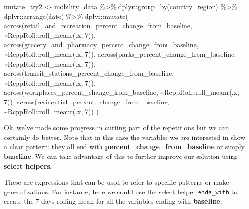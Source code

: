 \documentclass[
]{book}
\newenvironment{Shaded}{\begin{snugshade}}{\end{snugshade}}
\newcommand{\DecValTok}[1]{\textcolor[rgb]{0.00,0.00,0.81}{#1}}
\newcommand{\FunctionTok}[1]{\textcolor[rgb]{0.00,0.00,0.00}{#1}}
\newcommand{\NormalTok}[1]{#1}
\newcommand{\OtherTok}[1]{\textcolor[rgb]{0.56,0.35,0.01}{#1}}
\newcommand{\SpecialCharTok}[1]{\textcolor[rgb]{0.00,0.00,0.00}{#1}}
\begin{document}
\begin{Shaded}
\begin{Highlighting}[]
\NormalTok{mutate\_try2 }\OtherTok{\textless{}{-}}\NormalTok{ mobility\_data }\SpecialCharTok{\%\textgreater{}\%} 
\NormalTok{  dplyr}\SpecialCharTok{::}\FunctionTok{group\_by}\NormalTok{(country\_region) }\SpecialCharTok{\%\textgreater{}\%} 
\NormalTok{  dplyr}\SpecialCharTok{::}\FunctionTok{arrange}\NormalTok{(date) }\SpecialCharTok{\%\textgreater{}\%} 
\NormalTok{  dplyr}\SpecialCharTok{::}\FunctionTok{mutate}\NormalTok{(}
    \FunctionTok{across}\NormalTok{(retail\_and\_recreation\_percent\_change\_from\_baseline, }\SpecialCharTok{\textasciitilde{}}\NormalTok{RcppRoll}\SpecialCharTok{::}\FunctionTok{roll\_meanr}\NormalTok{(.x, }\DecValTok{7}\NormalTok{)),}
    \FunctionTok{across}\NormalTok{(grocery\_and\_pharmacy\_percent\_change\_from\_baseline, }\SpecialCharTok{\textasciitilde{}}\NormalTok{RcppRoll}\SpecialCharTok{::}\FunctionTok{roll\_meanr}\NormalTok{(.x, }\DecValTok{7}\NormalTok{)),}
    \FunctionTok{across}\NormalTok{(parks\_percent\_change\_from\_baseline, }\SpecialCharTok{\textasciitilde{}}\NormalTok{RcppRoll}\SpecialCharTok{::}\FunctionTok{roll\_meanr}\NormalTok{(.x, }\DecValTok{7}\NormalTok{)),}
    \FunctionTok{across}\NormalTok{(transit\_stations\_percent\_change\_from\_baseline, }\SpecialCharTok{\textasciitilde{}}\NormalTok{RcppRoll}\SpecialCharTok{::}\FunctionTok{roll\_meanr}\NormalTok{(.x, }\DecValTok{7}\NormalTok{)),}
    \FunctionTok{across}\NormalTok{(workplaces\_percent\_change\_from\_baseline, }\SpecialCharTok{\textasciitilde{}}\NormalTok{RcppRoll}\SpecialCharTok{::}\FunctionTok{roll\_meanr}\NormalTok{(.x, }\DecValTok{7}\NormalTok{)),}
    \FunctionTok{across}\NormalTok{(residential\_percent\_change\_from\_baseline, }\SpecialCharTok{\textasciitilde{}}\NormalTok{RcppRoll}\SpecialCharTok{::}\FunctionTok{roll\_meanr}\NormalTok{(.x, }\DecValTok{7}\NormalTok{))}
\NormalTok{    )}
\end{Highlighting}
\end{Shaded}

Ok, we've made some progress in cutting part of the repetitions but we can certainly do better. Note that in this case the variables we are interested in show a clear pattern: they all end with \textbf{percent\_change\_from\_baseline} or simply \textbf{baseline}. We can take advantage of this to further improve our solution using \textbf{select helpers}.

These are expressions that can be used to refer to specific patterns or make generalizations. For instance, here we could use the select helper \texttt{ends\_with} to create the 7-days rolling mean for all the variables ending with \textbf{baseline}.
\end{document}
